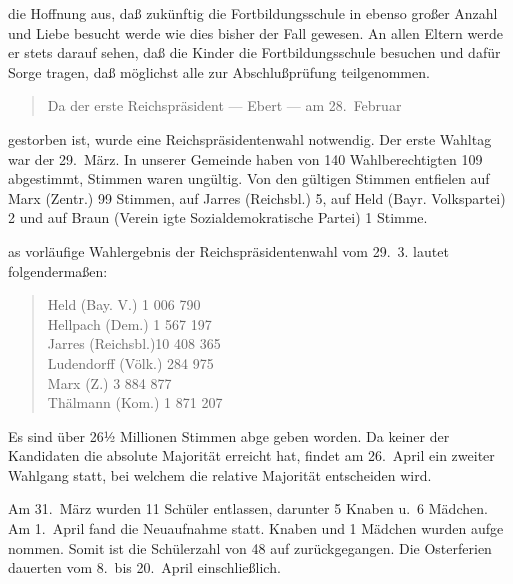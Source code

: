 

die Hoffnung aus, daß zukünftig die Fortbildungsschule\ob
in ebenso großer Anzahl und Liebe besucht werde wie\ob
dies bisher der Fall gewesen. An allen Eltern werde er\ob
stets darauf sehen, daß die Kinder die Fortbildungsschule\ob
besuchen und dafür Sorge tragen, daß möglichst alle\ob
zur Abschlußprüfung teilgenommen.


\pend
\begin{verse}
Da der erste Reichspräsident — Ebert — am 28.\ Februar
\end{verse}
\pstart
gestorben ist, wurde eine Reichspräsidentenwahl notwendig.\ob
Der erste Wahltag war der 29.\ März. In unserer\ob
Gemeinde haben von 140 Wahlberechtigten 109 abgestimmt, Stimmen waren ungültig. Von den gültigen\ob
Stimmen entfielen auf Marx (Zentr.) 99 Stimmen,\ob
auf Jarres (Reichsbl.) 5,\ob
auf Held (Bayr. Volkspartei) 2 und auf Braun (Verein\ohb
igte Sozialdemokratische Partei) 1 Stimme.

%
as vorläufige Wahlergebnis der Reichspräsidentenwahl\ob
vom 29.\ 3. lautet folgendermaßen:

\pend
{}
\pstart


\pend
\begin{verse}
Held (Bay. V.)     1 006 790\\
Hellpach (Dem.)    1 567 197\\
Jarres (Reichsbl.)10 408 365\\
Ludendorff (Völk.)   284 975\\
Marx (Z.)          3 884 877\\
Thälmann (Kom.)    1 871 207
\end{verse}
\pstart

Es sind über 26½ Millionen Stimmen abge\ohb
geben worden. Da keiner der Kandidaten die\ob
absolute Majorität erreicht hat, findet am 26.\ April\ob
ein zweiter Wahlgang statt, bei welchem die\ob
relative Majorität entscheiden wird.

Am 31.\ März wurden 11 Schüler entlassen,\ob
darunter 5 Knaben u.\ 6 Mädchen.\ob
Am 1.\ April fand die Neuaufnahme statt. Knaben und 1 Mädchen wurden aufge\ohb
nommen. Somit ist die Schülerzahl von 48 auf zurückgegangen.\ob
Die Osterferien dauerten vom 8.\ bis 20.\ April\ob
einschließlich.
\pend

